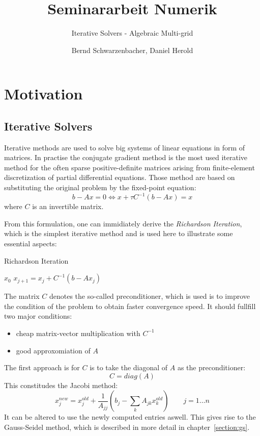 \documentclass[a4paper,11pt]{scrartcl}
\title{Seminararbeit Numerik}
\subtitle{Iterative Solvers - Algebraic Multi-grid}
\author{Bernd Schwarzenbacher, Daniel Herold}
\begin{document}
\maketitle
\tableofcontents
\pagebreak

\section{Motivation} \label{section:motiv}
\subsection{Iterative Solvers} \label{section:iter}
Iterative methods are used to solve big systems of linear equations in form of
matrices.
In practise the conjugate gradient method is the most used iterative method for
the often sparse positive-definite matrices arising from finite-element
discretization of partial differential equations.
Those method are based on substituting the original problem by the fixed-point
equation:
$$b-Ax = 0 \iff x + \tau C^{-1} (b-Ax) = x$$
where $C$ is an invertible matrix.

From this formulation, one can immidiately derive the
{\em Richardson Iteration}\/, which is the simplest iterative method and is
used here to illustrate some essential aspects:

\begin{algorithm}
\caption{Richardson Iteration}
\begin{algorithmic}
  \STATE {} \: $x_{0}$
    \STATE $x_{j+1} = x_{j} + C^{-1} (b - Ax_{j})$
  \ENDFOR
\end{algorithmic}
\end{algorithm}

The matrix $C$ denotes the so-called preconditioner, which is used is to
improve the condition of the problem to obtain faster convergence speed.
It should fullfill two major conditions:
\begin{itemize}
\item cheap matrix-vector multiplication with $C^{-1}$
\item good approxomiation of $A$
\end{itemize}

The first approach is for $C$ is to take the diagonal of $A$ as the
preconditioner:
$$C = diag(A)$$
This constitudes the Jacobi method:
$$ x_j^{new} = x_j^{old} + \frac{1}{A_{jj}} \left(b_{j} -
               \sum_{k} A_{jk} x_k^{old}\right)
               \qquad j = 1 \dots n$$
It can be altered to use the newly computed entries aswell. This gives rise to
the Gauss-Seidel method, which is described in more detail in
chapter~\ref{section:gs}.
\cite{iterative}
\end{document}
